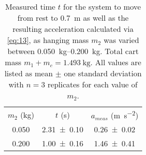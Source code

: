 \begin{table}[hb]
\caption{\label{tab:newtable1} Measured time $t$ for the system to move from rest to \qty{0.7}{\meter} as well as the resulting acceleration calculated via \cref{eq:13}, as hanging mass $m_2$ was varied between \qtyrange{0.050}{0.200}{\kilo\gram}.  Total cart mass $m_1 + m_c =\qty{1.493}{\kilogram}$. All values are listed as mean $\pm$ one standard deviation with $n=3$ replicates for each value of $m_2$.}
\begin{center}
\begin{ruledtabular}
\begin{tabular}{ccc}
$m_2$ (\unit{\kilo\gram}) & $t$ (\unit{\second}) & $a_{meas}$ (\unit{\meter\per\second\squared}) \\ 
\colrule
\num{0.050} & \num{2.31\pm0.10} & \num{0.26\pm0.02} \\ 
\num{0.200} & \num{1.00\pm0.16} & \num{1.46\pm0.41} \\ 
\end{tabular}
\end{ruledtabular}
\end{center}
\end{table}
